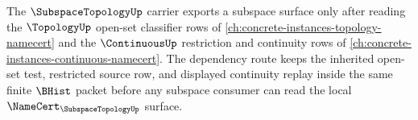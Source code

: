 The $\SubspaceTopologyUp$ carrier exports a subspace surface only after reading the $\TopologyUp$ open-set classifier rows of \autoref{ch:concrete-instances-topology-namecert} and the $\ContinuousUp$ restriction and continuity rows of \autoref{ch:concrete-instances-continuous-namecert}. The dependency route keeps the inherited open-set test, restricted source row, and displayed continuity replay inside the same finite $\BHist$ packet before any subspace consumer can read the local $\NameCert_{\SubspaceTopologyUp}$ surface.
